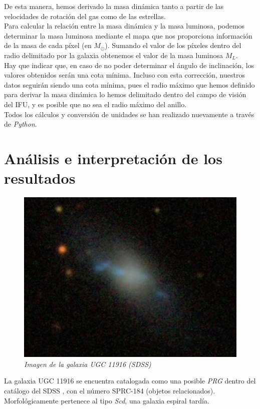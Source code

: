 \documentclass{article}
\begin{document}
De esta manera, hemos derivado la masa dinámica tanto a partir de las velocidades de rotación del gas como de las estrellas.\\Para calcular la relación entre la masa dinámica y la masa luminosa, podemos determinar la masa luminosa mediante el mapa que nos proporciona información de la masa de cada píxel (en $M_{\odot}$). Sumando el valor de los píxeles dentro del radio delimitado por la galaxia obtenemos el valor de la masa luminosa $M_{L}$.\\Hay que indicar que, en caso de no poder determinar el ángulo de inclinación, los valores obtenidos serán una cota mínima. Incluso con esta corrección, nuestros datos seguirán siendo una cota mínima, pues el radio máximo que hemos definido para derivar la masa dinámica lo hemos delimitado dentro del campo de visión del IFU, y es posible que no sea el radio máximo del anillo.\\ Todos los cálculos y conversión de unidades se han realizado nuevamente a través de \emph{Python}.
\section{Análisis e interpretación de los resultados}
\begin{figure}[H]
	\includegraphics[scale=.20]{imagen2.png}
	\centering	
	\caption{\emph{Imagen de la galaxia UGC 11916 (SDSS)}}
	\label{figura 2}
\end{figure}
La galaxia UGC 11916 se encuentra catalogada como una posible \emph{PRG} dentro del catálogo del SDSS \cite{Moiseev2011a}, con el número SPRC-184 (objetos relacionados). Morfológicamente pertenece al tipo \emph{Scd}, una galaxia espiral tardía.
\end{document}
